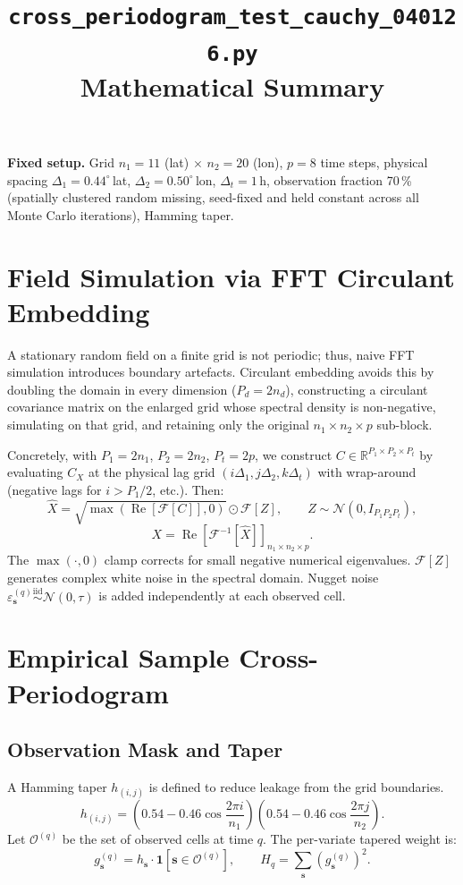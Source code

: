 \documentclass[12pt]{article}
\title{\texttt{cross\_periodogram\_test\_cauchy\_040126.py}\\[0.5em]
        \large Mathematical Summary}
\author{}
\date{}
\begin{document}
\maketitle

\bigskip
\noindent\textbf{Fixed setup.}
Grid $n_1=11$ (lat) $\times$ $n_2=20$ (lon), $p=8$ time steps,
physical spacing $\Delta_1=0.44^{\circ}$\,lat, $\Delta_2=0.50^{\circ}$\,lon,
$\Delta_t=1\,\mathrm{h}$,
observation fraction 70\,\% (spatially clustered random missing, seed-fixed
and held constant across all Monte Carlo iterations), Hamming taper.

\section{Field Simulation via FFT Circulant Embedding}

A stationary random field on a finite grid is not periodic; thus, naive FFT simulation introduces boundary artefacts. Circulant embedding avoids this by doubling the domain in every dimension ($P_d = 2n_d$), constructing a circulant covariance matrix on the enlarged grid whose spectral density is non-negative, simulating on that grid, and retaining only the original $n_1 \times n_2 \times p$ sub-block.

Concretely, with $P_1=2n_1$, $P_2=2n_2$, $P_t=2p$, we construct $C \in \mathbb{R}^{P_1 \times P_2 \times P_t}$ by evaluating $C_X$ at the physical lag grid $(i\Delta_1, j\Delta_2, k\Delta_t)$ with wrap-around (negative lags for $i > P_1/2$, etc.). Then:
\[
  \hat{X} = \sqrt{\max(\operatorname{Re}[\mathcal{F}[C]], 0)} \odot \mathcal{F}[Z], \qquad Z \sim \mathcal{N}(0, I_{P_1 P_2 P_t}),
\]
\[
  X = \operatorname{Re}[\mathcal{F}^{-1}[\hat{X}]]_{n_1 \times n_2 \times p}.
\]
The $\max(\cdot, 0)$ clamp corrects for small negative numerical eigenvalues. $\mathcal{F}[Z]$ generates complex white noise in the spectral domain. Nugget noise $\varepsilon_{\mathbf{s}}^{(q)} \overset{\text{iid}}{\sim} \mathcal{N}(0, \tau)$ is added independently at each observed cell.

\section{Empirical Sample Cross-Periodogram}

\subsection{Observation Mask and Taper}
A Hamming taper $h_{(i,j)}$ is defined to reduce leakage from the grid boundaries.
\[
  h_{(i,j)} = \left(0.54 - 0.46\cos\frac{2\pi i}{n_1}\right) \left(0.54 - 0.46\cos\frac{2\pi j}{n_2}\right).
\]
Let $\mathcal{O}^{(q)}$ be the set of observed cells at time $q$. The per-variate tapered weight is:
\[
  g_{\mathbf{s}}^{(q)} = h_{\mathbf{s}} \cdot \mathbf{1}[\mathbf{s} \in \mathcal{O}^{(q)}], \qquad H_q = \sum_{\mathbf{s}}(g_{\mathbf{s}}^{(q)})^2.
\]
\end{document}
